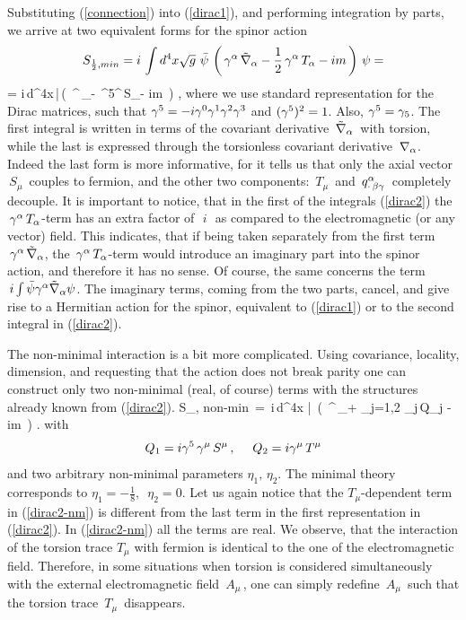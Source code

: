 Substituting (\ref{connection}) into (\ref{dirac1}), and 
performing integration by parts, we arrive at two equivalent 
forms for the spinor action
$$
S_{\frac12 , min} = i\,\int d^4x\sqrt{g}
\,\,{\bar \psi}\,\left(\,
\gamma^\alpha\,\tilde{\nabla}_\alpha - \frac12\,\gamma^\alpha\,T_\alpha - im 
\,\right)\,\psi =
$$\beq
= i\,\int d^4x\,{\bar \psi}\,\left(\,
\ga^\al\,\na_\al  - \,\ga^5\ga^\al\,S_\al - im
\,\right)\,\psi\,,
\label{dirac2}
\eeq
where we use standard representation for the Dirac matrices,
such that $\gamma^5=-i\gamma^0\gamma^1\gamma^2\gamma^3$ and $(\gamma^5)^2=1$.
Also, $\gamma^5=\gamma_5$. 
The first integral is written in terms of the covariant 
derivative $\,\tilde{\nabla}_\alpha\,$ with torsion, while 
the last is expressed through the torsionless covariant 
derivative  $\,\nabla_\alpha$. Indeed the last form is
more informative, for it tells us that only the axial vector
$\,S_\mu\,$ couples to fermion, and the other two
components:
$\,T_\mu\,$ and $\,q^\alpha_{\cdot\,\beta\gamma}\,$ completely 
decouple. It is important to notice, that in the first 
of the integrals (\ref{dirac2}) the $\,\gamma^\alpha\,T_\alpha$-term
has an extra factor of $\,\,i\,\,$ as compared to the 
electromagnetic (or any vector) field. This indicates, 
that if being taken separately from the first term 
$\,\gamma^\alpha\,\tilde{\nabla}_\alpha$, the $\,\gamma^\alpha\,T_\alpha$-term
would introduce an imaginary part into the spinor action,
and therefore it has no sense. Of course, the same concerns 
the term $\,i\int {\bar \psi} \gamma^\alpha{\tilde \nabla}_\alpha \psi$. 
The imaginary terms, coming from the two parts,
cancel, and give rise to a Hermitian action for the spinor, 
equivalent to (\ref{dirac1}) or to the second integral in 
(\ref{dirac2}).   

The non-minimal interaction is a bit more complicated.
Using covariance, locality, dimension, and 
requesting that the action does not break parity
one can construct only two non-minimal (real, of course)
terms with the structures already known from (\ref{dirac2}). 
\beq
S_{, non-min} \,=\, i\,\int d^4x\,\,{\bar \psi}\,
\Big(\, \ga^\al\,\na_\al  + \sum_{j=1,2} \eta_j\,Q_j - im
\,\Big)\,\psi\,.
\label{dirac2-nm}
\eeq
with 
$$
Q_1 = i\gamma^5\,\gamma^\mu\, S^\mu\,,\,\,\,\,\,\,\,\,
Q_2 = i \gamma^\mu\, T^\mu
$$
and two arbitrary 
non-minimal parameters $\eta_1,\,\eta_2$. The minimal theory
corresponds to $\eta_1 = -\frac18,\,\,\,\eta_2 = 0$. Let us again notice 
that the $T_\mu$-dependent term in (\ref{dirac2-nm}) is different 
from the last term in the first representation in (\ref{dirac2}).
In (\ref{dirac2-nm}) all the terms are real. We observe, that 
the interaction of the torsion trace $T_\mu$ with fermion is
identical to the one of the electromagnetic field. Therefore, in some
situations when torsion is considered simultaneously with the external 
electromagnetic field $\,A_\mu\,$, 
one can simply redefine $\,A_\mu\,$ such that the torsion trace
$\,T_\mu\,$ disappears.


